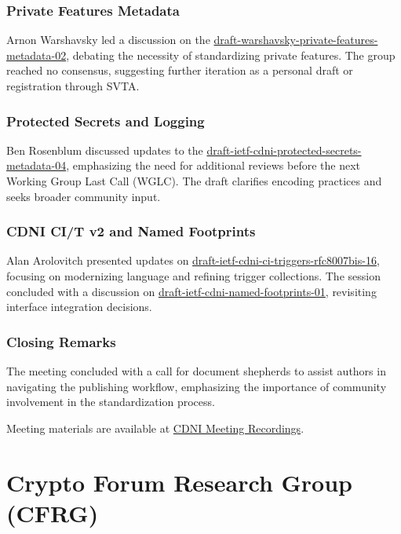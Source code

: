 \documentclass{article}
\begin{document}
\subsubsection{Private Features Metadata}
Arnon Warshavsky led a discussion on the \href{https://datatracker.ietf.org/doc/html/draft-warshavsky-private-features-metadata-02}{draft-warshavsky-private-features-metadata-02}, debating the necessity of standardizing private features. The group reached no consensus, suggesting further iteration as a personal draft or registration through SVTA.

\subsubsection{Protected Secrets and Logging}
Ben Rosenblum discussed updates to the \href{https://datatracker.ietf.org/doc/html/draft-ietf-cdni-protected-secrets-metadata-04}{draft-ietf-cdni-protected-secrets-metadata-04}, emphasizing the need for additional reviews before the next Working Group Last Call (WGLC). The draft clarifies encoding practices and seeks broader community input.

\subsubsection{CDNI CI/T v2 and Named Footprints}
Alan Arolovitch presented updates on \href{https://datatracker.ietf.org/doc/html/draft-ietf-cdni-ci-triggers-rfc8007bis-16}{draft-ietf-cdni-ci-triggers-rfc8007bis-16}, focusing on modernizing language and refining trigger collections. The session concluded with a discussion on \href{https://datatracker.ietf.org/doc/html/draft-ietf-cdni-named-footprints-01}{draft-ietf-cdni-named-footprints-01}, revisiting interface integration decisions.

\subsubsection{Closing Remarks}
The meeting concluded with a call for document shepherds to assist authors in navigating the publishing workflow, emphasizing the importance of community involvement in the standardization process.

Meeting materials are available at \href{https://www.meetecho.com/ietf122/recordings#CDNI}{CDNI Meeting Recordings}.



\newpage

\section{Crypto Forum Research Group (CFRG)}
\end{document}
